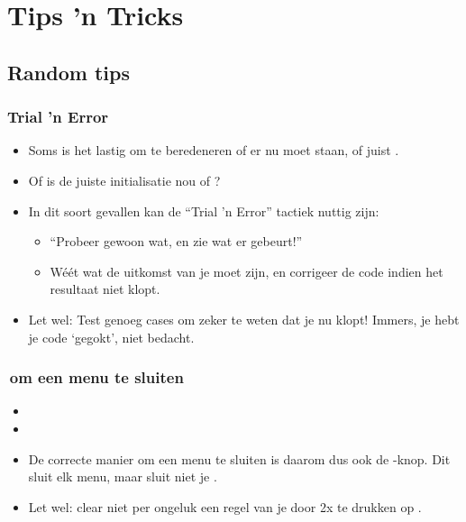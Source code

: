 \section{Tips 'n Tricks}

\subsection{Random tips}

\begin{frame}
\frametitle{Trial 'n Error}

\begin{itemize}
  \item<1-> Soms is het lastig om te beredeneren of er nu  moet staan, of juist .
  \item<2-> Of is de juiste initialisatie nou  of ?
  \item<3-> In dit soort gevallen kan de ``Trial 'n Error'' tactiek nuttig zijn:
  \begin{itemize}
    \item<4-> ``Probeer gewoon wat, en zie wat er gebeurt!''
    \item<5-> W\'e\'et wat de uitkomst van je  moet zijn, en corrigeer de code indien het resultaat niet klopt.
  \end{itemize}
  \item<6-> Let wel: Test genoeg cases om zeker te weten dat je  nu klopt!
    Immers, je hebt je code `gegokt', niet bedacht.
\end{itemize}

\end{frame}



\begin{frame}
\frametitle{\tiCLEAR\,om een menu te sluiten}


\begin{itemize}
  \item<1-> 
  \item<2-> 
  \item<3-> De correcte manier om een menu te sluiten is daarom dus ook de \tiCLEAR-knop. Dit sluit elk menu, maar sluit niet je .
  \item<4-> Let wel: clear niet per ongeluk een regel van je  door 2x te drukken op \tiCLEAR.
\end{itemize}

\end{frame}




